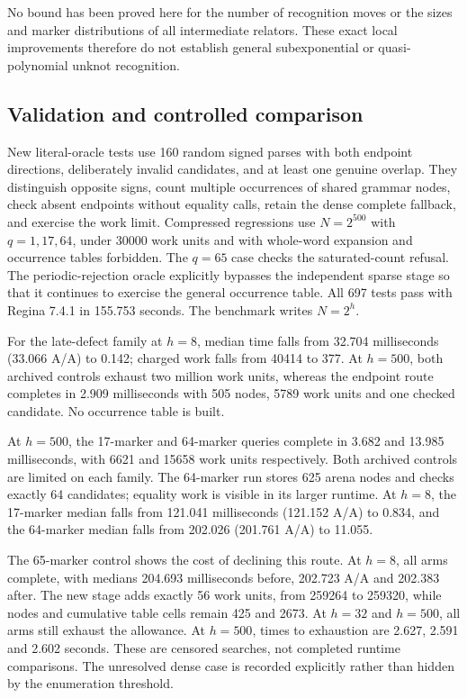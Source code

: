 No bound has been proved here for the number of recognition moves or the
sizes and marker distributions of all intermediate relators. These exact
local improvements therefore do not establish general subexponential or
quasi-polynomial unknot recognition.

\subsection{Validation and controlled comparison}

New literal-oracle tests use 160 random signed parses with both endpoint
directions, deliberately invalid candidates, and at least one genuine
overlap. They distinguish opposite signs, count multiple occurrences of
shared grammar nodes, check absent endpoints without equality calls, retain
the dense complete fallback, and exercise the work limit. Compressed
regressions use $N=2^{500}$ with $q=1,17,64$, under 30000 work units and
with whole-word expansion and occurrence tables forbidden. The $q=65$
case checks the saturated-count refusal.
The periodic-rejection oracle explicitly bypasses the independent sparse
stage so that it continues to exercise the general occurrence table.
All 697 tests pass with Regina 7.4.1 in 155.753 seconds.
The benchmark writes $N=2^h$.





For the late-defect family at $h=8$, median time falls from 32.704
milliseconds (33.066 A/A) to 0.142; charged work falls from 40414 to
377. At $h=500$, both archived controls exhaust two million work units,
whereas the endpoint route completes in 2.909 milliseconds with 505 nodes,
5789 work units and one checked candidate. No occurrence table is built.

At $h=500$, the 17-marker and 64-marker queries complete in 3.682 and
13.985 milliseconds, with 6621 and 15658 work units respectively. Both
archived controls are limited on each family. The 64-marker run stores
625 arena nodes and checks exactly 64 candidates; equality work is visible
in its larger runtime. At $h=8$, the 17-marker median falls from 121.041
milliseconds (121.152 A/A) to 0.834, and the 64-marker median falls from
202.026 (201.761 A/A) to 11.055.

The 65-marker control shows the cost of declining this route. At $h=8$,
all arms complete, with medians 204.693 milliseconds before, 202.723 A/A
and 202.383 after. The new stage adds exactly 56 work units, from 259264
to 259320, while nodes and cumulative table cells remain 425 and 2673.
At $h=32$ and $h=500$, all arms still exhaust the allowance. At $h=500$,
times to exhaustion are 2.627, 2.591 and 2.602 seconds. These are censored
searches, not completed runtime comparisons. The unresolved dense case
is recorded explicitly rather than hidden by the enumeration threshold.


